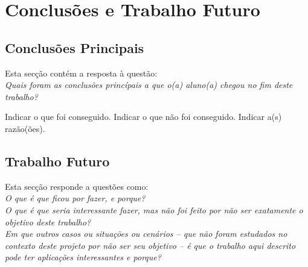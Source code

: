 \chapter{Conclusões e Trabalho Futuro}
\label{chap:conc-trab-futuro}

\section{Conclusões Principais}
\label{sec:conc-princ}

Esta secção contém a resposta à questão: \\
\emph{Quais foram as conclusões princípais a que o(a) aluno(a) chegou no fim deste trabalho?}

Indicar o que foi conseguido.
Indicar o que não foi conseguido. Indicar a(s) razão(ões).

\section{Trabalho Futuro}
\label{sec:trab-futuro}

Esta secção responde a questões como:\\
\emph{O que é que ficou por fazer, e porque?}\\
\emph{O que é que seria interessante fazer, mas não foi feito por não ser exatamente o objetivo deste trabalho?}\\
\emph{Em que outros casos ou situações ou cenários -- que não foram estudados no contexto deste projeto por não ser seu objetivo -- é que o trabalho aqui descrito pode ter aplicações interessantes e porque?}